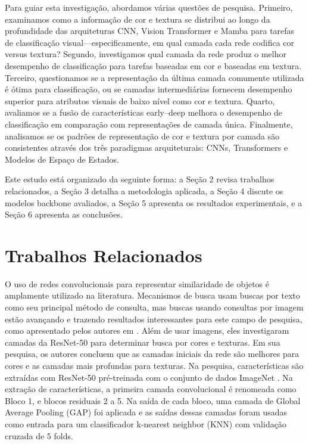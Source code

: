 \documentclass[conference]{IEEEtran}
\begin{document}
Para guiar esta investiga\c{c}\~{a}o, abordamos v\'{a}rias quest\~{o}es de pesquisa. Primeiro, examinamos como a informa\c{c}\~{a}o de cor e textura se distribui ao longo da profundidade das arquiteturas CNN, Vision Transformer e Mamba para tarefas de classifica\c{c}\~{a}o visual---especificamente, em qual camada cada rede codifica cor versus textura? Segundo, investigamos qual camada da rede produz o melhor desempenho de classifica\c{c}\~{a}o para tarefas baseadas em cor e baseadas em textura. Terceiro, questionamos se a representa\c{c}\~{a}o da \'{u}ltima camada comumente utilizada \'{e} \'{o}tima para classifica\c{c}\~{a}o, ou se camadas intermedi\'{a}rias fornecem desempenho superior para atributos visuais de baixo n\'{i}vel como cor e textura. Quarto, avaliamos se a fus\~{a}o de caracter\'{i}sticas early--deep melhora o desempenho de classifica\c{c}\~{a}o em compara\c{c}\~{a}o com representa\c{c}\~{o}es de camada \'{u}nica. Finalmente, analisamos se os padr\~{o}es de representa\c{c}\~{a}o de cor e textura por camada s\~{a}o consistentes atrav\'{e}s dos tr\^{e}s paradigmas arquiteturais: CNNs, Transformers e Modelos de Espa\c{c}o de Estados.

Este estudo est\'{a} organizado da seguinte forma: a Se\c{c}\~{a}o 2 revisa trabalhos relacionados, a Se\c{c}\~{a}o 3 detalha a metodologia aplicada, a Se\c{c}\~{a}o 4 discute os modelos backbone avaliados, a Se\c{c}\~{a}o 5 apresenta os resultados experimentais, e a Se\c{c}\~{a}o 6 apresenta as conclus\~{o}es.


\section{Trabalhos Relacionados}

O uso de redes convolucionais para representar similaridade de objetos \'{e} amplamente utilizado na literatura. Mecanismos de busca usam buscas por texto como seu principal m\'{e}todo de consulta, mas buscas usando consultas por imagem est\~{a}o avan\c{c}ando e trazendo resultados interessantes para este campo de pesquisa, como apresentado pelos autores em \cite{b2}. Al\'{e}m de usar imagens, eles investigaram camadas da ResNet-50 para determinar busca por cores e texturas. Em sua pesquisa, os autores concluem que as camadas iniciais da rede s\~{a}o melhores para cores e as camadas mais profundas para texturas. Na pesquisa, caracter\'{i}sticas s\~{a}o extra\'{i}das com ResNet-50 pr\'{e}-treinada com o conjunto de dados ImageNet \cite{b3}. Na extra\c{c}\~{a}o de caracter\'{i}sticas, a primeira camada convolucional \'{e} renomeada como Bloco 1, e blocos residuais 2 a 5. Na sa\'{i}da de cada bloco, uma camada de Global Average Pooling (GAP) foi aplicada e as sa\'{i}das dessas camadas foram usadas como entrada para um classificador k-nearest neighbor (KNN) com valida\c{c}\~{a}o cruzada de 5 folds.
\end{document}
